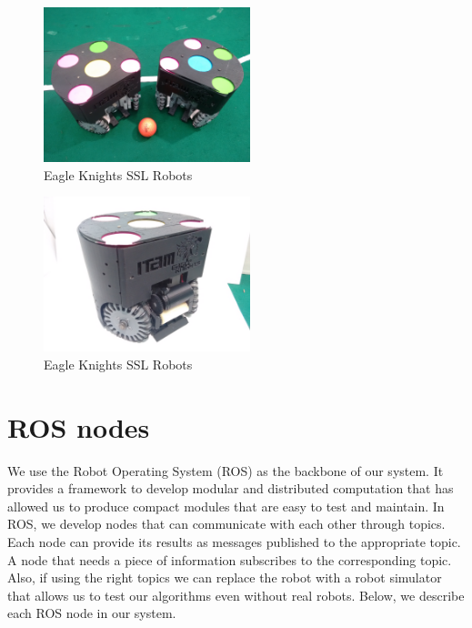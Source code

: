 \documentclass[]{llncs}
\newcommand{\TODO}[1]{{\textcolor{blue}{ToDo: {#1}}}}
\begin{document}

\begin{figure}[htb]
	\centering
	\includegraphics[width=6cm]{./pictures/two_ekbots.jpg}
	\caption{Eagle Knights SSL Robots}
	\label{fig:two-ekbots}  
\end{figure}

\begin{figure}[htb]
	\centering
	\includegraphics[width=6cm]{./pictures/ekbot_front.jpg}
	\caption{Eagle Knights SSL Robots}
	\label{fig:ekbot-front}  
\end{figure}




\section{ROS nodes}

We use the Robot Operating System (ROS) as the backbone of our system. It provides a framework to develop modular and distributed computation that has allowed us to produce compact modules that are easy to test and maintain. In ROS, we develop nodes that can communicate with each other through topics. Each node can provide its results as messages published to the appropriate topic. A node that needs a piece of information subscribes to the corresponding topic. Also, if using the right topics we can replace the robot with a robot simulator that allows us to test our algorithms even without real robots. Below, we describe each ROS node in our system.
\end{document}
